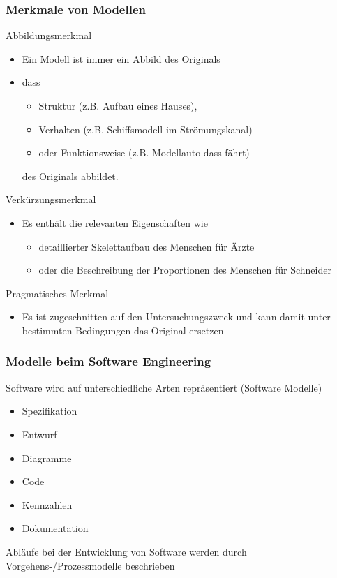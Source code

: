 \begin{frame}
\frametitle{Merkmale von Modellen}
	Abbildungsmerkmal
	\begin{itemize}
		\item Ein Modell ist immer ein Abbild des Originals
		\item dass
		\begin{itemize}
			\item Struktur (z.B. Aufbau eines Hauses),
			\item Verhalten (z.B. Schiffsmodell im Strömungskanal)
			\item oder Funktionsweise (z.B. Modellauto dass fährt)
		\end{itemize}
		des Originals abbildet.
	\end{itemize}
	\bigskip
	Verkürzungsmerkmal
	\begin{itemize}
		\item Es enthält die relevanten Eigenschaften wie
		\begin{itemize}
			\item detaillierter Skelettaufbau des Menschen für Ärzte
			\item oder die Beschreibung der Proportionen des Menschen für Schneider
		\end{itemize}
	\end{itemize}
	\bigskip
	Pragmatisches Merkmal
	\begin{itemize}
		\item Es ist zugeschnitten auf den Untersuchungszweck und kann damit
		unter bestimmten Bedingungen das Original ersetzen
	\end{itemize}
	\bigskip
\end{frame}

\begin{frame}
\frametitle{Modelle beim Software Engineering}
	Software wird auf unterschiedliche Arten repräsentiert (Software Modelle)
		\begin{itemize}
			\item Spezifikation
			\item Entwurf
			\item Diagramme
			\item Code
			\item Kennzahlen
			\item Dokumentation
		\end{itemize}
	\bigskip
	Abläufe bei der Entwicklung von Software werden durch Vorgehens-/Prozessmodelle beschrieben
\end{frame}

